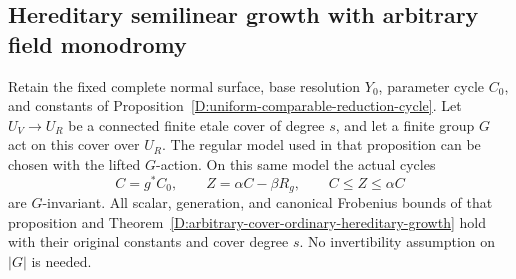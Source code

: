 \subsection{Hereditary semilinear growth with arbitrary field monodromy}

\begin{lemma}
\label{D:equivariant-cover-comparable-cycles}
Retain the fixed complete normal surface, base resolution $Y_0$,
parameter cycle $C_0$, and constants of
Proposition~\ref{D:uniform-comparable-reduction-cycle}.
Let $U_V\to U_R$ be a connected finite etale cover of degree $s$,
and let a finite group $G$ act on this cover over $U_R$.
The regular model used in that proposition can be chosen with
the lifted $G$-action. On this same model the actual cycles
\[
 C=g^*C_0,\qquad Z=\alpha C-\beta R_g,\qquad
                 C\le Z\le\alpha C                         \tag{D.SH.1}
\]
are $G$-invariant. All scalar, generation, and canonical
Frobenius bounds of that proposition and
Theorem~\ref{D:arbitrary-cover-ordinary-hereditary-growth}
hold with their original constants and cover degree $s$.
No invertibility assumption on $|G|$ is needed.
\end{lemma}

